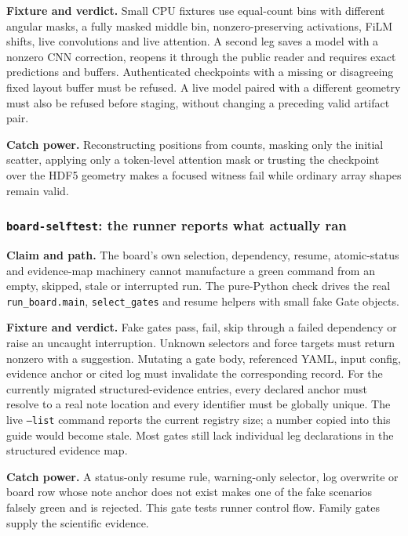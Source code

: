 \documentclass[10pt,aps,prd,twocolumn,nofootinbib]{revtex4-2}
\newcommand{\code}[1]{\texttt{#1}}
\begin{document}
\textbf{Fixture and verdict.}  Small CPU fixtures use equal-count bins with
different angular masks, a fully masked middle bin, nonzero-preserving
activations, FiLM shifts, live convolutions and live attention.  A second leg
saves a model with a nonzero CNN correction, reopens it through the public
reader and requires exact predictions and buffers.  Authenticated checkpoints
with a missing or disagreeing fixed layout buffer must be refused.  A live
model paired with a different geometry must also be refused before staging,
without changing a preceding valid artifact pair.

\textbf{Catch power.}  Reconstructing positions from counts, masking only the
initial scatter, applying only a token-level attention mask or trusting the
checkpoint over the HDF5 geometry makes a focused witness fail while ordinary
array shapes remain valid.

\subsubsection{\code{board-selftest}: the runner reports what actually ran}

\textbf{Claim and path.}  The board's own selection, dependency, resume,
atomic-status and evidence-map machinery cannot manufacture a green command
from an empty, skipped, stale or interrupted run.  The pure-Python check
drives the real \code{run\_board.main}, \code{select\_gates} and resume
helpers with small fake Gate objects.

\textbf{Fixture and verdict.}  Fake gates pass, fail, skip through a failed
dependency or raise an uncaught interruption.  Unknown selectors and force
targets must return nonzero with a suggestion.  Mutating a gate body,
referenced YAML, input config, evidence anchor or cited log must invalidate
the corresponding record.  For the currently migrated structured-evidence
entries, every declared anchor must resolve to a real note location and every
identifier must be globally unique.  The live \code{--list} command reports
the current registry size; a number copied into this guide would become stale.
Most gates still lack individual leg declarations in the structured evidence
map.

\textbf{Catch power.}  A status-only resume rule, warning-only selector, log
overwrite or board row whose note anchor does not exist makes one of the
fake scenarios falsely green and is rejected.  This gate tests runner control
flow.  Family gates supply the scientific evidence.
\end{document}
